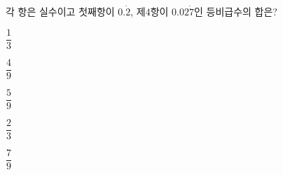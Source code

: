 각 항은 실수이고 첫째항이 $0.\dot{2}$, 제$4$항이 $0.02\dot{7}$인 등비급수의 합은?
\begin{choices32}{\rule[-3ex]{0pt}{8ex}$\dfrac{1}{3}$}{\rule[-3ex]{0pt}{8ex}$\dfrac{4}{9}$}{\rule[-3ex]{0pt}{8ex}$\dfrac{5}{9}$}{\rule[-3ex]{0pt}{8ex}$\dfrac{2}{3}$}{\rule[-3ex]{0pt}{8ex}$\dfrac{7}{9}$}\end{choices32}
